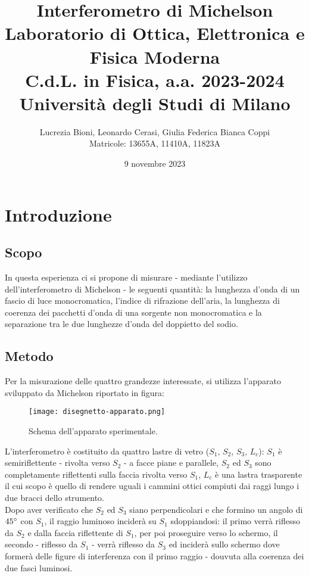 \documentclass[]{article}
\title{%
    \Huge Interferometro di Michelson \\
    \Large Laboratorio di Ottica, Elettronica e Fisica Moderna \\ C.d.L. in Fisica, a.a. 2023-2024 \\ Università degli Studi di Milano}
\author{\LARGE Lucrezia Bioni, Leonardo Cerasi, Giulia Federica Bianca Coppi \\ Matricole: 13655A, 11410A, 11823A}
\date{9 novembre 2023}
\let\oldsection\section%
\renewcommand{\section}{%
	\renewcommand{\theequation}{\thesection.\arabic{equation}}%
	\oldsection}%
\let\oldsubsection\subsection%
\renewcommand{\subsection}{%
	\renewcommand{\theequation}{\thesubsection.\arabic{equation}}%
	\oldsubsection}%
\begin{document}
\maketitle

\section{Introduzione}

\subsection{Scopo}

In questa esperienza ci si propone di misurare - mediante l'utilizzo dell'interferometro di Michelson - le seguenti quantità: la lunghezza d'onda di un fascio di luce monocromatica, l'indice di rifrazione dell'aria, la lunghezza di coerenza dei pacchetti d'onda di una sorgente non monocromatica e la separazione tra le due lunghezze d'onda del doppietto del sodio.

\subsection{Metodo}

Per la misurazione delle quattro grandezze interessate, si utilizza l'apparato sviluppato da Michelson riportato in figura:
\begin{figure}[!h]
    \centering
    \texttt{[image: disegnetto-apparato.png]}
    \caption{Schema dell'apparato sperimentale.}
    \label{schema}
\end{figure} 
L'interferometro è costituito da quattro lastre di vetro ($S_1, \, S_2, \, S_3, \, L_c$): $S_1$ è semiriflettente - rivolta verso $S_2$ - a facce piane e parallele, $S_2$ ed $S_3$ sono completamente riflettenti sulla faccia rivolta verso $S_1$, $L_c$ è una lastra trasparente il cui scopo è quello di rendere uguali i cammini ottici compiuti dai raggi lungo i due bracci dello strumento. \\ Dopo aver verificato che $S_2$ ed $S_3$ siano perpendicolari e che formino un angolo di $45\degree$ con $S_1$, il raggio luminoso inciderà su $S_1$ sdoppiandosi: il primo verrà riflesso da $S_2$ e dalla faccia riflettente di $S_1$, per poi proseguire verso lo schermo, il secondo - riflesso da $S_1$ - verrà riflesso da $S_3$ ed inciderà sullo schermo dove formerà delle figure di interferenza con il primo raggio - douvuta alla coerenza dei due fasci luminosi.
\end{document}
